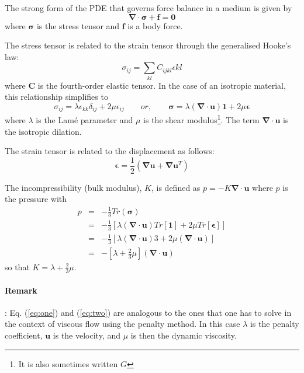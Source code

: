 The strong form of the PDE that governs force balance in a medium is given by
\[
{\bm \nabla}\cdot{\bm \sigma}  + {\bm f} = {\bm 0}
\]
where ${\bm \sigma}$ is the stress tensor and ${\bm f}$ is a body force.

The stress tensor is related to the strain tensor through the generalised 
Hooke's law:
\begin{equation}
\sigma_{ij}=\sum_{kl}C_{ijkl}\epsilon{kl} \label{eq:one}
\end{equation}
where ${\bm C}$ is the fourth-order elastic tensor.
In the case of an isotropic material, this relationship simplifies to
\begin{equation}
\sigma_{ij}=\lambda \epsilon_{kk} \delta_{ij} + 2\mu \epsilon_{ij}
\quad\quad
or, 
\quad\quad
{\bm \sigma} = \lambda ({\bm \nabla}\cdot{\bm u})  {\bm 1} + 2\mu {\bm \epsilon}   \label{eq:two}
\end{equation}
where $\lambda$ is the Lam\'e parameter and $\mu$ is the shear modulus\footnote{It is also sometimes written $G$}.
The term ${\bm \nabla}\cdot{\bm u}$ is the isotropic dilation.

 

The strain tensor is related to the displacement as follows: 
\[
{\bm \epsilon} = \frac{1}{2}({\bm \nabla}{\bm u} + {\bm \nabla}{\bm u}^T)
\]

The incompressibility (bulk modulus), $K$, is defined as $p=-K {\bm \nabla}\cdot{\bm u}$ 
where $p$ is the pressure with 
\begin{eqnarray}
p&=&-\frac{1}{3}Tr({\bm \sigma}) \nonumber\\
 &=& -\frac{1}{3} [ \lambda ({\bm \nabla}\cdot{\bm u}) Tr[{\bm 1}] + 2 \mu Tr[{\bm \epsilon}]] \nonumber\\
 &=& -\frac{1}{3} [ \lambda ({\bm \nabla}\cdot{\bm u})  3  + 2 \mu  ({\bm \nabla}\cdot{\bm u}) ] \nonumber\\
 &=& -[ \lambda  + \frac{2}{3} \mu ]   ({\bm \nabla}\cdot{\bm u})  
\end{eqnarray}
so that $K=\lambda+\frac{2}{3}\mu$.



\paragraph{Remark}: Eq. (\ref{eq:one}) and (\ref{eq:two}) are analogous to the ones that one has to solve
in the context of viscous flow using the penalty method. In this case $\lambda$ is the penalty coefficient, 
${\bm u}$ is the velocity, and $\mu$ is then the dynamic viscosity.

